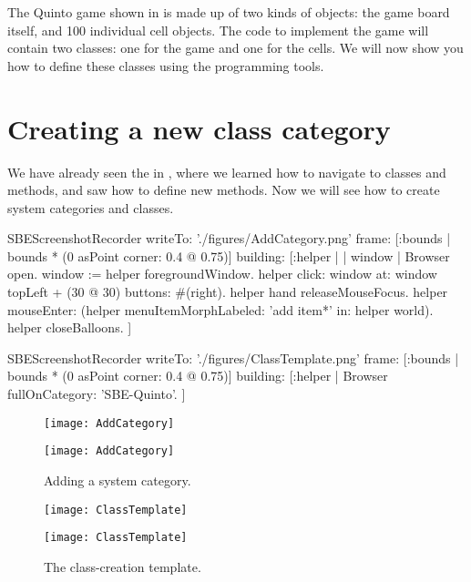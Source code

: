 \documentclass[a4paper,10pt,twoside]{book}
\begin{document}
The Quinto game shown in  is made up of two kinds of objects: the game board itself, and 100 individual cell objects.  The \squeak code to implement the game will contain two classes: one for the game and one for the cells.
We will now show you how to define these classes using the \squeak programming tools.

\section{Creating a new class category}

We have already seen the  in , where we learned how to navigate to classes and methods, and saw how to define new methods.
Now we will see how to create system categories and classes.


\begin{ExecuteSmalltalkScript}
SBEScreenshotRecorder writeTo: './figures/AddCategory.png' frame: [:bounds | bounds * (0 asPoint corner: 0.4 @ 0.75)] building: [:helper |
	| window |
	Browser open.
	window := helper foregroundWindow.
	helper click: window at: window topLeft + (30 @ 30) buttons: #(right).
	helper hand releaseMouseFocus.
	helper mouseEnter: (helper menuItemMorphLabeled: 'add item*' in: helper world).
	helper closeBalloons.
]
\end{ExecuteSmalltalkScript}
\begin{ExecuteSmalltalkScript}
SBEScreenshotRecorder writeTo: './figures/ClassTemplate.png' frame: [:bounds | bounds * (0 asPoint corner: 0.4 @ 0.75)] building: [:helper |
	Browser fullOnCategory: 'SBE-Quinto'.
]
\end{ExecuteSmalltalkScript}
\begin{figure}[htb]
\begin{minipage}[b]{0.48\textwidth}
\ifluluelse
	{\centerline {\texttt{[image: AddCategory]}}}
	{\centerline {\texttt{[image: AddCategory]}}}
	\caption{Adding a system category.
	\label{fig:addCategory}}
\end{minipage}
\hfill
\begin{minipage}[b]{0.48\textwidth}
\ifluluelse
	{\centerline {\texttt{[image: ClassTemplate]}}}
	{\centerline {\texttt{[image: ClassTemplate]}}}
	\caption{The class-creation template.
	\label{fig:classTemplate}}
\end{minipage}
\end{figure}
\end{document}
